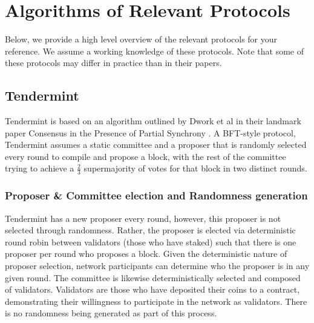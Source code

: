 \documentclass[10pt,journal,compsoc]{IEEEtran}
\begin{document}
\section{Algorithms of Relevant Protocols}
Below, we provide a high level overview of the relevant protocols for your reference. We assume a working knowledge of these protocols. Note that some of these protocols may differ in practice than in their papers.

\subsection{Tendermint}
Tendermint \cite{Buchman} is based on an algorithm outlined by Dwork et al in their landmark paper Consensus in the Presence of Partial Synchrony \cite{DworkEtAl}. A BFT-style protocol, Tendermint assumes a static committee and a proposer that is randomly selected every round to compile and propose a block, with the rest of the committee trying to achieve a \(\frac{2}{3}\) supermajority of votes for that block in two distinct rounds.

\subsubsection{Proposer \& Committee election and Randomness generation}
Tendermint has a new proposer every round, however, this proposer is not selected through randomness. Rather, the proposer is elected via deterministic round robin between validators (those who have staked) such that there is one proposer per round who proposes a block. Given the deterministic nature of proposer selection, network participants can determine who the proposer is in any given round.
The committee is likewise deterministically selected and composed of validators. Validators are those who have deposited their coins to a contract, demonstrating their willingness to participate in the network as validators. There is no randomness being generated as part of this process.
\end{document}
